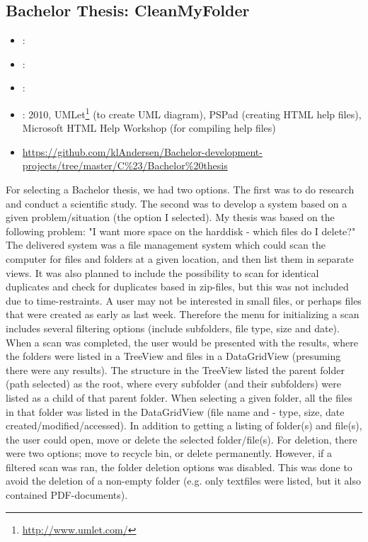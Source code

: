 \subsection{Bachelor Thesis: CleanMyFolder}
\label{sec:bach_thesis}
\begin{itemize} 
	\item {}: 
	\item {}: 
	\item {}: 
	\item {}:  2010, UMLet\footnote{\url{http://www.umlet.com/}} (to create UML diagram), 
	PSPad (creating HTML help files),  Microsoft HTML Help Workshop (for compiling help files)
	\item {} \url{https://github.com/klAndersen/Bachelor-development-projects/tree/master/C%23/Bachelor%20thesis}
\end{itemize} 
For selecting a Bachelor thesis, we had two options. 
The first was to do research and conduct a scientific study. 
The second was to develop a system based on a given problem/situation (the option I selected).
My thesis was based on the following problem: "I want more space on the harddisk - which files do I delete?" 
\vspace{0.5em}\newline
The delivered system was a file management system which could scan the computer for files and folders at a given location, and then list them in separate views. 
It was also planned to include the possibility to scan for identical duplicates and check for duplicates based in zip-files, but this was not included due to time-restraints.
\vspace{0.5em}\newline
A user may not be interested in small files, or perhaps files that were created as early as last week. 
Therefore the menu for initializing a scan includes several filtering options (include subfolders, file type, size and date).
When a scan was completed, the user would be presented with the results, where the folders were listed in a TreeView and files in a DataGridView (presuming there were any results).
The structure in the TreeView listed the parent folder (path selected) as the root, where every subfolder (and their subfolders) were listed as a child of that parent folder.
When selecting a given folder, all the files in that folder was listed in the DataGridView (file name and - type, size, date created/modified/accessed).
\vspace{0.5em}\newline
In addition to getting a listing of folder(s) and file(s), the user could open, move or delete the selected folder/file(s). 
For deletion, there were two options; move to recycle bin, or delete permanently. 
However, if a filtered scan was ran, the folder deletion options was disabled. 
This was done to avoid the deletion of a non-empty folder (e.g. only textfiles were listed, but it also contained PDF-documents).

